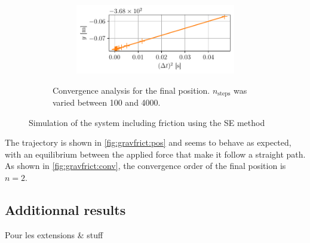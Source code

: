 \begin{figure}[h]
\begin{subfigure}{0.45\linewidth}
\begin{subfigure}{\linewidth}
        \end{subfigure}
        \begin{subfigure}{\linewidth}
            \centering
            \includegraphics[width=\linewidth]{figures/grav_frict_convergence_y.pdf}
        \end{subfigure}
        \caption{Convergence analysis for the final position. $n_\textrm{steps}$ was varied between 100 and 4000.}
        \label{fig:gravfrict:conv}
    \end{subfigure}
    \caption{Simulation of the system including friction using the SE method}
\end{figure}

The trajectory is shown in \autoref{fig:gravfrict:pos} and seems to behave as expected, with an equilibrium between the applied force that make it follow a straight path. As shown in \autoref{fig:gravfrict:conv}, the convergence order of the final position is $n=2$.

\subsection{Additionnal results}

Pour les extensions \& stuff
